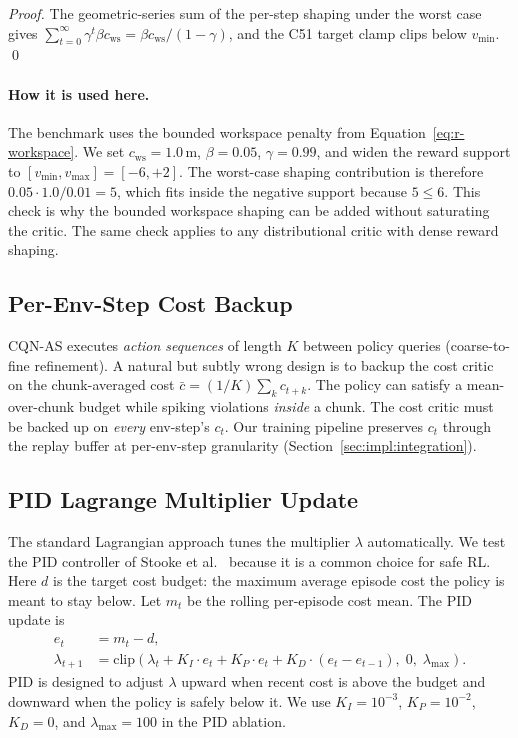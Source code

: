 \documentclass[11pt,a4paper]{report}
\newcommand{\cqnas}{CQN-AS}
\begin{document}
\begin{proof}
The geometric-series sum of the per-step shaping under the worst
case gives $\sum_{t=0}^\infty \gamma^t \beta c_{\mathrm{ws}} =
\beta c_{\mathrm{ws}} / (1-\gamma)$, and the C51 target clamp
clips below $v_{\min}$. \qed
\end{proof}

\paragraph{How it is used here.}
The benchmark uses the bounded workspace penalty from
Equation~\ref{eq:r-workspace}. We set $c_{\mathrm{ws}} = 1.0$\,m,
$\beta = 0.05$, $\gamma = 0.99$, and widen the reward support to
$[v_{\min}, v_{\max}] = [-6, +2]$. The worst-case shaping contribution
is therefore $0.05 \cdot 1.0 / 0.01 = 5$, which fits inside the
negative support because $5 \le 6$. This check is why the bounded
workspace shaping can be added without saturating the critic. The same
check applies to any distributional critic with dense reward shaping.

\subsection{Per-Env-Step Cost Backup}
\label{sec:method:lagrangian:per-step}

\cqnas{} executes \emph{action sequences} of length $K$ between
policy queries (coarse-to-fine refinement). A natural but subtly
wrong design is to backup the cost critic on the chunk-averaged
cost $\bar{c} = (1/K) \sum_{k} c_{t+k}$. The policy can satisfy a
mean-over-chunk budget while spiking violations \emph{inside} a
chunk. The cost critic must be backed up on \emph{every} env-step's
$c_t$. Our training pipeline preserves $c_t$ through the replay
buffer at per-env-step granularity
(Section~\ref{sec:impl:integration}).

\subsection{PID Lagrange Multiplier Update}
\label{sec:method:lagrangian:pid}

The standard Lagrangian approach tunes the multiplier $\lambda$
automatically. We test the PID controller of
Stooke et al.~\cite{stooke2020pid} because it is a common choice for
safe RL. Here $d$ is the target cost budget: the maximum average
episode cost the policy is meant to stay below. Let $m_t$ be the
rolling per-episode cost mean. The PID update is
\begin{align}
  e_t &= m_t - d, \\
  \lambda_{t+1} &= \mathrm{clip}\!\left(\lambda_t + K_I \cdot e_t
    + K_P \cdot e_t + K_D \cdot (e_t - e_{t-1}),
    \; 0,\; \lambda_{\max}\right).
  \label{eq:pid-lambda}
\end{align}
PID is designed to adjust $\lambda$ upward when recent cost is above
the budget and downward when the policy is safely below it. We use
$K_I = 10^{-3}$, $K_P = 10^{-2}$, $K_D = 0$, and
$\lambda_{\max} = 100$ in the PID ablation.
\end{document}

